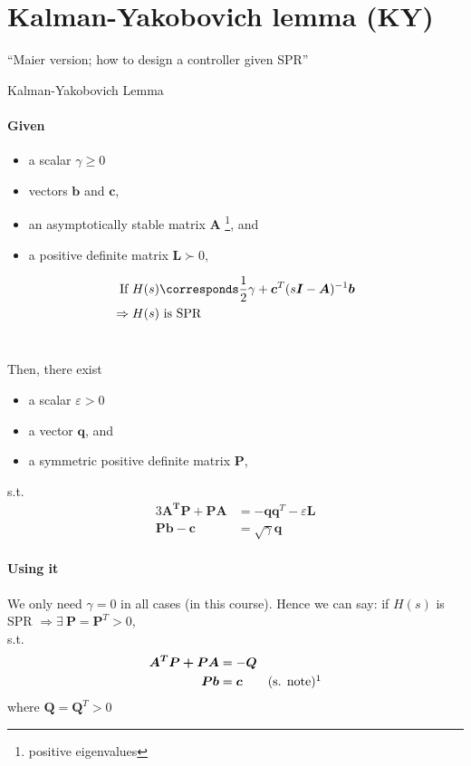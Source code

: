 \section{Kalman-Yakobovich lemma (KY)}
``Maier version; how to design a controller given SPR''\\

\begin{lemma}{Kalman-Yakobovich Lemma}
    \paragraph{Given}
    \begin{itemize}
    \item a scalar $\gamma \geq 0$
    \item vectors $\bm{b}$ and $\bm{c}$,
    \item an asymptotically stable matrix $\bm{A}$%
        \footnote{positive eigenvalues}, and
    \item a positive definite matrix $\bm{L} \succ 0$,
    \end{itemize}
    \begin{alignat*}{3}
    \txt{If } H(s) &\corresponds \frac{1}{2} \gamma + \bm{c}^T (s\bm{I}-\bm{A})^{-1} \bm{b}\\
        \Rightarrow H(s) &\txt{ is SPR}
    \end{alignat*}~

    Then, there exist
    \begin{itemize}
    \item a scalar $\varepsilon >0$
    \item a vector $\bm{q}$, and
    \item a symmetric positive definite matrix $\bm{P}$,
    \end{itemize}
    s.t.
    \begin{alignat}{3}
    \bm{A^TP + PA}   &= -\bm{qq}^T - \varepsilon \bm{L}
        \label{eq:ky-lemma-atp}\\
    \bm{Pb} - \bm{c}      &= \sqrt{\gamma} \bm{q}
        \label{eq:ky-lemma-bc}
    \end{alignat}
\end{lemma}

\paragraph{Using it}
We only need $\gamma=0$ in all cases (in this course).
Hence we can say: if $H(s)$ is SPR $\Rightarrow \exists ~ \bm{P}=\bm{P}^T>0$,\\
s.t.
\begin{alignat*}{3}
\bm{A^TP + PA}   &= -\bm{Q}\\
\bm{Pb} &= \bm{c} \qquad \txt{(s. note)}\footnotemark  \\
\end{alignat*}%
%
where $\bm{Q}=\bm{Q}^T>0$

